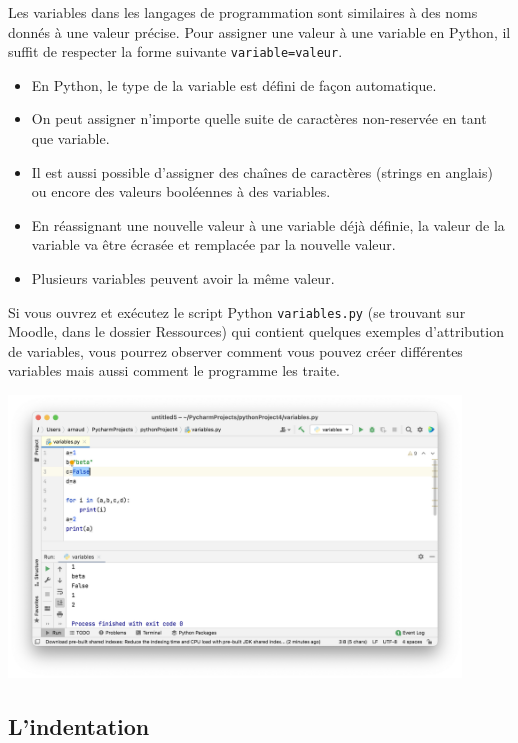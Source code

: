 Les variables dans les langages de programmation sont similaires à des noms donnés à une valeur précise.
Pour assigner une valeur à une variable en Python, il suffit de respecter la forme suivante \lstinline{variable=valeur}.

\begin{conseil}
\begin{itemize}
	\item En Python, le type de la variable est défini de façon automatique.
	\item On peut assigner n'importe quelle suite de caractères non-reservée en tant que variable.
	\item Il est aussi possible d'assigner des chaînes de caractères (strings en anglais) ou encore des valeurs booléennes à des variables.
	\item En réassignant une nouvelle valeur à une variable déjà définie, la valeur de la variable va être écrasée et remplacée par la nouvelle valeur.
	\item Plusieurs variables peuvent avoir la même valeur.
\end{itemize}
\end{conseil}


Si vous ouvrez et exécutez le script Python \lstinline{variables.py} (se trouvant sur Moodle, dans le dossier Ressources) qui contient quelques exemples d'attribution de variables, vous pourrez observer comment vous pouvez créer différentes variables mais aussi comment le programme les traite.

\begin{center}
	\includegraphics[width=12cm]{6}	
\end{center}


\subsection{L'indentation}

